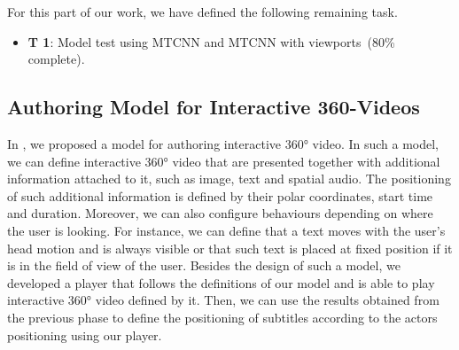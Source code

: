 For this part of our work, we have defined the following remaining task.

\begin{itemize}
    \item \textbf{T 1}: Model test using MTCNN and MTCNN with viewports~(80\% complete).
\end{itemize}

\subsection{Authoring Model for Interactive 360-Videos}
\label{subsec:dynamic_subtitles}

In \cite{mendes2020authoring}, we proposed a model for authoring interactive 360° video. In such a model, we can define interactive 360° video that are presented together with additional information attached to it, such as image, text and spatial audio. The positioning of such additional information is defined by their polar coordinates, start time and duration. Moreover, we can also configure behaviours depending on where the user is looking. For instance, we can define that a text moves with the user's head motion and is always visible or that such text is placed at fixed position if it is in the field of view of the user. Besides the design of such a model, we developed a player that follows the definitions of our model and is able to play interactive 360° video defined by it. Then, we can use the results obtained from the previous phase to define the positioning of subtitles according to the actors positioning using our player.